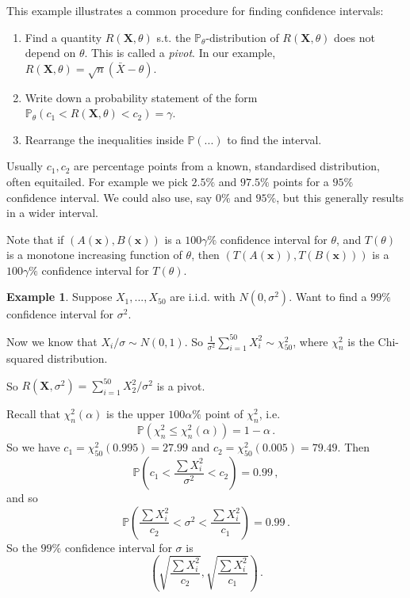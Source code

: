 \documentclass[a4paper,11pt]{article}
\theoremstyle{definition}
\newtheorem*{ex}{Example}
\numberwithin{equation}{section}
\begin{document}
This example illustrates a common procedure for finding confidence intervals:
\begin{enumerate}
    \item Find a quantity $R(\mathbf{X},\theta)$ s.t. the $\mathbb{P}_\theta$-distribution of $R(\mathbf{X},\theta)$ does not depend on $\theta$. This is called a \emph{pivot}. In our example, $R(\mathbf{X},\theta)=\sqrt{n}(\bar{X}-\theta)$.
    \item Write down a probability statement of the form $\mathbb{P}_\theta(c_1<R(\mathbf{X},\theta)<c_2)=\gamma$.
    \item Rearrange the inequalities inside $\mathbb{P}(...)$ to find the interval.
\end{enumerate}

Usually $c_1,c_2$ are percentage points from a known, standardised distribution, often equitailed. For example we pick $2.5\%$ and $97.5\%$ points for a $95\%$ confidence interval. We could also use, say $0\%$ and $95\%$, but this generally results in a wider interval.

Note that if $(A(\mathbf{x}),B(\mathbf{x}))$ is a $100\gamma\%$ confidence interval for $\theta$, and $T(\theta)$ is a monotone increasing function of $\theta$, then $(T(A(\mathbf{x})),T(B(\mathbf{x})))$ is a $100\gamma\%$ confidence interval for $T(\theta)$.

\begin{ex}
Suppose $X_1,...,X_{50}$ are i.i.d. with $N(0,\sigma^2)$. Want to find a $99\%$ confidence interval for $\sigma^2$.

Now we know that $X_i/\sigma\sim N(0,1)$. So $\frac{1}{\sigma^2}\sum_{i=1}^{50} X_i^2\sim \chi^2_{50}$, where $\chi_n^2$ is the Chi-squared distribution.

So $R(\mathbf{X},\sigma^2)=\sum_{i=1}^{50} X_2^2/\sigma^2$ is a pivot.

Recall that $\chi_n^2(\alpha)$ is the upper $100\alpha\%$ point of $\chi^2_n$, i.e. 
\[
\mathbb{P}(\chi_n^2\leq\chi_n^2(\alpha))=1-\alpha\,.
\]
So we have $c_1=\chi_{50}^2(0.995)=27.99$ and $c_2=\chi_{50}^2(0.005)=79.49$. Then
\[
\mathbb{P}\left(c_1<\frac{\sum X_i^2}{\sigma^2}<c_2\right)=0.99\,,
\]
and so
\[
\mathbb{P}\left(\frac{\sum X_i^2}{c_2}<\sigma^2<\frac{\sum X_i^2}{c_1}\right)=0.99\,.
\]
So the $99\%$ confidence interval for $\sigma$ is 
\[
\left(\sqrt{\frac{\sum X_i^2}{c_2}},\sqrt{\frac{\sum X_i^2}{c_1}}\right)\,.
\]
\end{ex}
\end{document}
